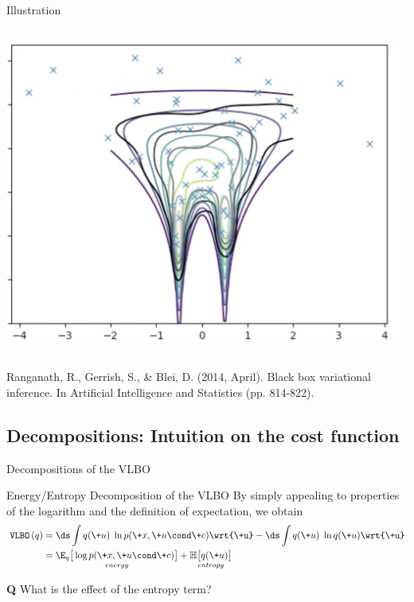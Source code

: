 \documentclass[10pt]{beamer}
\newcommand{\VLBO}{\,\texttt{VLBO}\,}
\begin{document}
\begin{frame}{Illustration}
\begin{minipage}[t][.9\textheight]{\textwidth}
\begin{columns}[t]
\includegraphics[width=.7\textwidth]{images/intro_animation_4.png}
\end{columns}

\vfill

\tiny Ranganath, R., Gerrish, S., \& Blei, D. (2014, April). Black box variational inference. In Artificial Intelligence and Statistics (pp. 814-822).
  \end{minipage}
  
\end{frame}


\subsection{Decompositions: Intuition on the cost function}
\begin{frame}{Decompositions of the VLBO}
\begin{block}{Energy/Entropy Decomposition of the VLBO}
By simply appealing to properties of the logarithm and the definition of expectation, we obtain 
\begin{align*}
\VLBO(q) & = \ds\int  q(\+u) \; \ln p(\+x,\+u  \cond \+c) \wrt{\+u}   - \ds\int  q(\+u) \; \ln q(\+u) \wrt{\+u}  \\
& =  \underset{energy}{ \E_q \big[ \log p(\+x, \+u  \cond \+c ) \big] } + \underset{entropy}{ \mathbb{H} \big[q(\+u) \big] }  
\end{align*}

\end{block} 
\vfill \tiny \textbf{Q}  What is the effect of the entropy term?
\end{frame}
\end{document}
